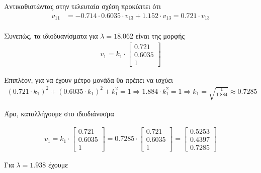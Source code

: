 \documentclass{article}
\begin{document}
	\noindent
	Αντικαθιστώντας στην τελευταία σχέση προκύπτει ότι
	\begin{align*}	
		v_{11} &= -0.714 \cdot 0.6035 \cdot v_{13} + 1.152 \cdot v_{13} = 0.721 \cdot v_{13}\\
	\end{align*}

	\pagebreak
	\noindent
	Συνεπώς, τα ιδιοδυανίσματα για $λ = 18.062$ είναι της μορφής 
	\begin{align*}	
		v_{1} = k_{1} \cdot
		\begin{bmatrix}
			0.721 \\
			0.6035 \\
			1 
		\end{bmatrix}
	\end{align*}
	
	\noindent
	Επιπλέον, για να έχουν μέτρο μονάδα θα πρέπει να ισχύει
	\begin{align*}	
		(0.721 \cdot k_{1})^2 + (0.6035 \cdot k_{1})^2 + k_{1}^2 = 1 \Rightarrow 
		1.884 \cdot k_{1}^2 = 1 \Rightarrow
		k_{1} = \sqrt{\frac{1}{1.884}} \approx 0.7285
	\end{align*}	
	
	\noindent
	Άρα, καταλλήγουμε στο ιδιοδιάνυσμα
	
	\begin{align*}	
		v_{1} = k_{1} \cdot
		\begin{bmatrix}
			0.721 \\
			0.6035 \\
			1 
		\end{bmatrix} = 
		0.7285 \cdot
		\begin{bmatrix}
			0.721 \\
			0.6035 \\
			1
		\end{bmatrix} = 
		\begin{bmatrix}
			0.5253 \\
			0.4397 \\
			0.7285
		\end{bmatrix}
	\end{align*}

	\noindent
	Για $λ = 1.938$ έχουμε
	
\end{document}
